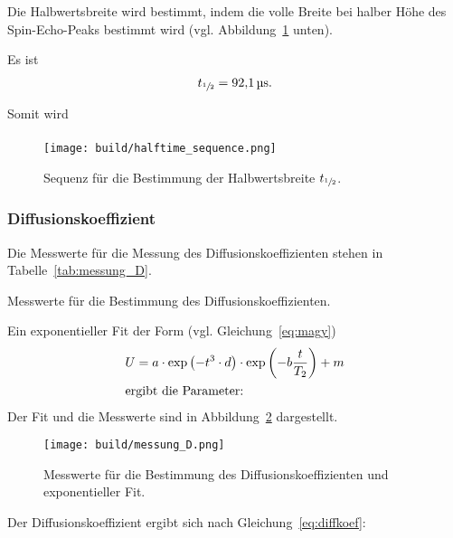 Die Halbwertsbreite wird bestimmt, indem die volle Breite bei halber Höhe des Spin-Echo-Peaks bestimmt wird (vgl. Abbildung~\ref{fig:halftime_sequence} unten).

Es ist
\begin{align}%
  \label{eq:t_1/2}
  t_{\sfrac{1}{2}} = \SI{92.1}{\micro\second}.
\end{align}

Somit wird
\begin{align}%
  \label{eq:g}
  
\end{align}



\begin{figure}[ht]
  \centering
  \texttt{[image: build/halftime\_sequence.png]}
  \caption{Sequenz für die Bestimmung der Halbwertsbreite $t_{\sfrac{1}{2}}$.}%
  \label{fig:halftime_sequence}
\end{figure}


\subsubsection{Diffusionskoeffizient}%
\label{sub:diffusionskoeefizient}
Die Messwerte für die Messung des Diffusionskoeffizienten stehen in Tabelle~\ref{tab:messung_D}.

\begin{table}[ht]
  \centering
  \caption{Messwerte für die Bestimmung des Diffusionskoeffizienten.}%
  \label{tab:messung_D}
  
\end{table}

Ein exponentieller Fit der Form (vgl. Gleichung~\eqref{eq:magy})
\begin{align*}
  U &= a \cdot \exp{\left(- t^3 \cdot d\right)} \cdot \exp{\left(-b \frac{t}{T_2}\right)}+ m \\
  \intertext{ergibt die Parameter:}
  
\end{align*}
Der Fit und die Messwerte sind in Abbildung~\ref{fig:messung_D} dargestellt.

\begin{figure}[ht]
  \centering
  \texttt{[image: build/messung\_D.png]}
  \caption{Messwerte für die Bestimmung des Diffusionskoeffizienten und exponentieller Fit.}%
  \label{fig:messung_D}
\end{figure}

Der Diffusionskoeffizient ergibt sich nach Gleichung~\eqref{eq:diffkoef}:
\begin{align}%
  \label{eq:d}
  
\end{align}


